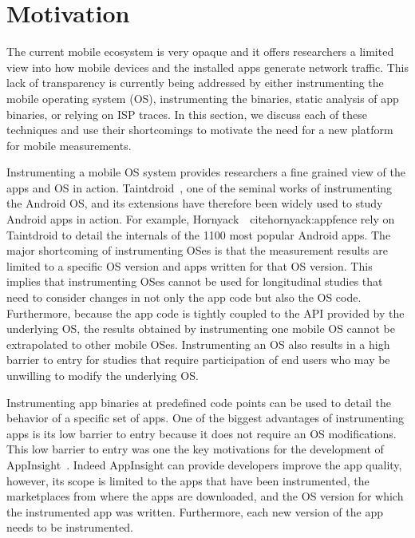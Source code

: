 \section{Motivation}
\label{sec:motivation}

The current mobile ecosystem is very opaque and it offers researchers  a
limited view into how mobile devices and the installed apps generate
network traffic. This lack of transparency is currently being addressed by
either instrumenting the mobile operating system (OS), instrumenting the
binaries, static analysis of app binaries, or relying on ISP traces. In
this section, we discuss each of these techniques and use their 
shortcomings to motivate the need for a new platform for mobile
measurements.      

Instrumenting a mobile OS system provides researchers a fine grained view
of the apps and OS in action. Taintdroid~\cite{enck:taintdroid}, one of the
seminal works of instrumenting the Android OS, and its extensions have
therefore been widely used to study Android apps in action. For example,
Hornyack~\etal~cite{hornyack:appfence} rely on Taintdroid to detail the
internals of the 1100 most popular Android apps. The major shortcoming of
instrumenting OSes is that the measurement results are limited to a 
specific OS version and apps written for that OS version. This implies that
instrumenting OSes cannot be used for longitudinal studies that need to
consider changes in not only the app code but also the OS code. 
Furthermore, because the app code is tightly coupled to the API provided by
the underlying OS, the results obtained by instrumenting  one mobile OS
cannot be extrapolated to other mobile OSes. Instrumenting an OS also
results in a high barrier to entry for studies that require participation
of end users  who may be unwilling to modify the underlying OS. 

Instrumenting app binaries at predefined code points can be used to detail
the behavior of a specific set of apps. One of the biggest advantages of 
instrumenting apps is its low barrier to entry because it does not require
an OS modifications. This low barrier to entry was one the key motivations
for the development of AppInsight~\cite{ravindranath:appinsight}. Indeed
AppInsight can provide developers improve the app quality, however, its
scope is limited to the apps that have been instrumented, the marketplaces
from where the apps are downloaded, and the OS version for which the
instrumented app was written. Furthermore, each new version of the app
needs to be instrumented.

